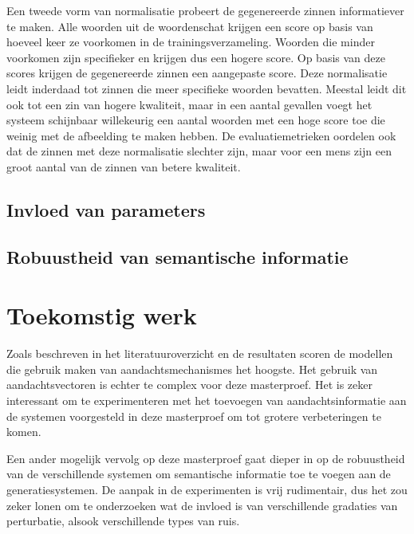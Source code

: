 Een tweede vorm van normalisatie probeert de gegenereerde zinnen informatiever te maken. Alle woorden uit de woordenschat krijgen een score op basis van hoeveel keer ze voorkomen in de trainingsverzameling. Woorden die minder voorkomen zijn specifieker en krijgen dus een hogere score. Op basis van deze scores krijgen de gegenereerde zinnen een aangepaste score. Deze normalisatie leidt inderdaad tot zinnen die meer specifieke woorden bevatten. Meestal leidt dit ook tot een zin van hogere kwaliteit, maar in een aantal gevallen voegt het systeem schijnbaar willekeurig een aantal woorden met een hoge score toe die weinig met de afbeelding te maken hebben. De evaluatiemetrieken oordelen ook dat de zinnen met deze normalisatie slechter zijn, maar voor een mens zijn een groot aantal van de zinnen van betere kwaliteit.
\subsection{Invloed van parameters}

\subsection{Robuustheid van semantische informatie}

\section{Toekomstig werk}
Zoals beschreven in het literatuuroverzicht en de resultaten scoren de modellen die gebruik maken van aandachtsmechanismes het hoogste. Het gebruik van aandachtsvectoren is echter te complex voor deze masterproef. Het is zeker interessant om te experimenteren met het toevoegen van aandachtsinformatie aan de systemen voorgesteld in deze masterproef om tot grotere verbeteringen te komen. 

Een ander mogelijk vervolg op deze masterproef gaat dieper in op de robuustheid van de verschillende systemen om semantische informatie toe te voegen aan de generatiesystemen.
De aanpak in de experimenten is vrij rudimentair, dus het zou zeker lonen om te onderzoeken wat de invloed is van verschillende gradaties van perturbatie, alsook verschillende types van ruis.
